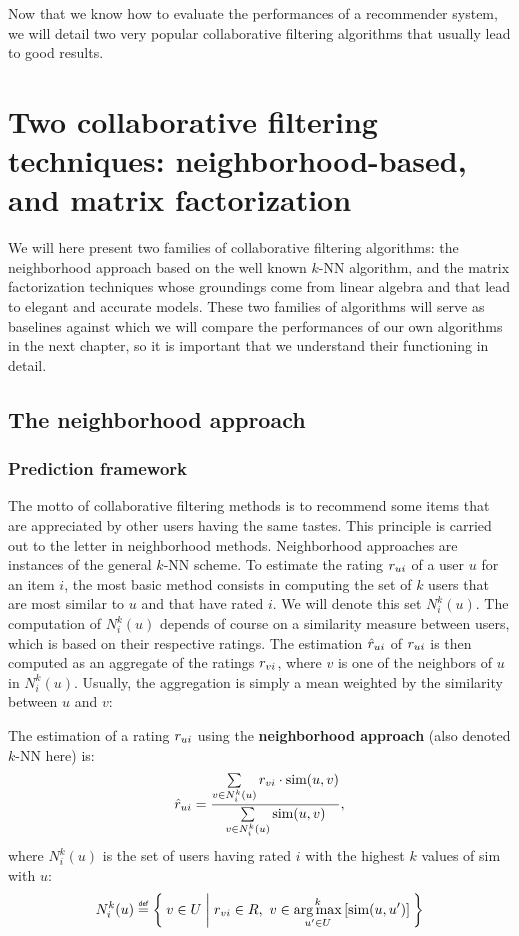 Now that we know how to evaluate the performances of a recommender system, we
will detail two very popular collaborative filtering algorithms that usually
lead to good results.

\section{Two collaborative filtering techniques: neighborhood-based, and matrix
factorization}
\label{SEC:neighborhood_and_matrix_facto_review}

We will here present two families of collaborative filtering algorithms: the
neighborhood approach based on the well known $k$-NN algorithm, and the matrix
factorization techniques whose groundings come from linear algebra and that
lead to elegant and accurate models. These two families of algorithms will
serve as baselines against which we will compare the performances of our own
algorithms in the next chapter, so it is important that we understand their
functioning in detail.

\subsection{The neighborhood approach}
\label{SEC:neighborhood_approach}

\subsubsection{Prediction framework}

The motto of collaborative filtering methods is to recommend some items that
are appreciated by other users having the same tastes. This principle is
carried out to the letter in neighborhood methods. Neighborhood approaches are instances of the general $k$-NN scheme. To estimate
the rating $r_{ui}$ of a user $u$ for an item $i$, the most basic method consists
in computing  the set of $k$ users that are most similar to $u$ and
that have rated $i$. We will denote this set $N_i^k(u)$. The computation of
$N_i^k(u)$ depends of course on a similarity measure between users, which is
based on their respective ratings. The estimation $\hat{r}_{ui}$ of $r_{ui}$ is then
computed as an aggregate of the ratings $r_{vi}$, where $v$ is one of the
neighbors of $u$ in $N_i^k(u)$. Usually, the aggregation is simply a mean
weighted by the similarity between $u$ and $v$:

\begin{definition}
  The estimation of a rating $r_{ui}$ using the \textbf{neighborhood approach} (also
  denoted $k$-NN here) is:
  $$\hat{r}_{ui} = \frac{\sum\limits_{v \in N_i^k(u)} r_{vi} \cdot \text{sim}(u, v)}
  {\sum\limits_{v \in N_i^k(u)}\text{sim}(u, v)},$$
  where $N_i^k(u)$ is the set of users having rated $i$ with the highest $k$
  values of sim with $u$:
  $$N_i^k(u) \eqdef \Set{v \in U | \rvi \in R,~v\in \argmax_{u' \in
  U}^k\left[\text{sim}(u, u')\right]}$$
\end{definition}

